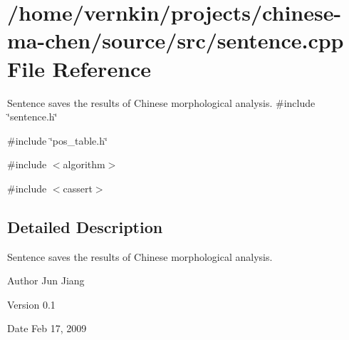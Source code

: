 \section{/home/vernkin/projects/chinese-\/ma-\/chen/source/src/sentence.cpp File Reference}
\label{sentence_8cpp}


Sentence saves the results of Chinese morphological analysis.  
{\ttfamily \#include \char`\"{}sentence.h\char`\"{}}\par
{\ttfamily \#include \char`\"{}pos\_\-table.h\char`\"{}}\par
{\ttfamily \#include $<$algorithm$>$}\par
{\ttfamily \#include $<$cassert$>$}\par


\subsection{Detailed Description}
Sentence saves the results of Chinese morphological analysis. \begin{DoxyAuthor}{Author}
Jun Jiang 
\end{DoxyAuthor}
\begin{DoxyVersion}{Version}
0.1 
\end{DoxyVersion}
\begin{DoxyDate}{Date}
Feb 17, 2009 
\end{DoxyDate}
